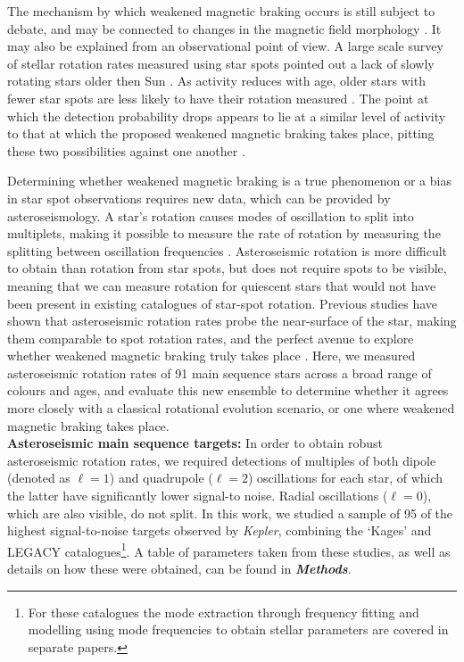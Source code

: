 \documentclass[12pt]{article}
\begin{document}
The mechanism by which weakened magnetic braking occurs is  still subject to debate, and may be connected to changes in the magnetic field morphology \cite{reville+2015,garraffo+2016, metcalfe+2019, see+2019}. It may also be explained from an observational point of view. A large scale survey of stellar rotation rates measured using star spots pointed out a lack of slowly rotating stars older then Sun \cite{mcquillan+2014}. As activity reduces with age, older stars with fewer star spots are less likely to have their rotation measured \cite{matt+2015}. The point at which the detection probability drops appears to lie at a similar level of activity to that at which the proposed weakened magnetic braking takes place, pitting these two possibilities against one another \cite{vansaders+2019}.

Determining whether weakened magnetic braking is a true phenomenon or a bias in star spot observations requires new data, which can be provided by asteroseismology. A star's rotation causes modes of oscillation to split into multiplets, making it possible to measure the rate of rotation by measuring the splitting between oscillation frequencies \cite{ledoux1951}. Asteroseismic rotation is more difficult to obtain than rotation from star spots, but does not require  spots to be visible, meaning that we can measure rotation for quiescent stars that would not have been present in existing catalogues of star-spot rotation. Previous studies have shown that asteroseismic rotation rates probe the near-surface of the star, making them comparable to spot rotation rates, and the perfect avenue to explore whether weakened magnetic braking truly takes place \cite{lund+2014, benomar+2015}. Here, we measured asteroseismic rotation rates of 91 main sequence stars across a broad range of colours and ages, and evaluate this new ensemble to determine whether it agrees more closely with a classical rotational evolution scenario, or one where weakened magnetic braking takes place.\\

\textbf{Asteroseismic main sequence targets:} In order to obtain robust asteroseismic rotation rates, we required detections of multiples of both dipole (denoted as $\ell = 1$) and quadrupole ($\ell = 2$) oscillations for each star, of which the latter have significantly lower signal-to noise. Radial oscillations ($\ell = 0$), which are also visible, do not split. In this work, we studied a sample of 95 of the highest signal-to-noise targets observed by \textit{Kepler}, combining the `Kages' \cite{silvaaguirre+2015,davies+2016} and LEGACY \cite{lund+2017, silvaaguirre+2017} catalogues\footnote{For these catalogues the mode extraction through frequency fitting \cite{davies+2016, lund+2017} and modelling using mode frequencies to obtain stellar parameters \cite{silvaaguirre+2015, silvaaguirre+2017} are covered in separate papers.}. A table of parameters taken from these studies, as well as details on how these were obtained, can be found in \textbf{\textit{Methods}}. 
\end{document}
